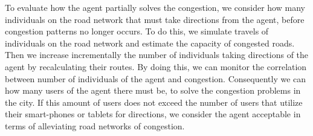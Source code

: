 To evaluate how the agent partially solves the congestion, we consider how many individuals on the road network that must take directions from the agent, before congestion patterns no longer occurs. To do this, we simulate travels of individuals on the road network and estimate the capacity  of congested roads. Then we increase incrementally the number of individuals taking directions of the agent by recalculating their routes. By doing this, we can monitor the correlation between number of individuals of the agent and congestion. Consequently we can how many users of the agent there must be, to solve the congestion problems in the city. If this amount of users does not exceed the number of users that utilize their smart-phones or tablets for directions, we consider the agent acceptable in terms of alleviating road networks of congestion.





